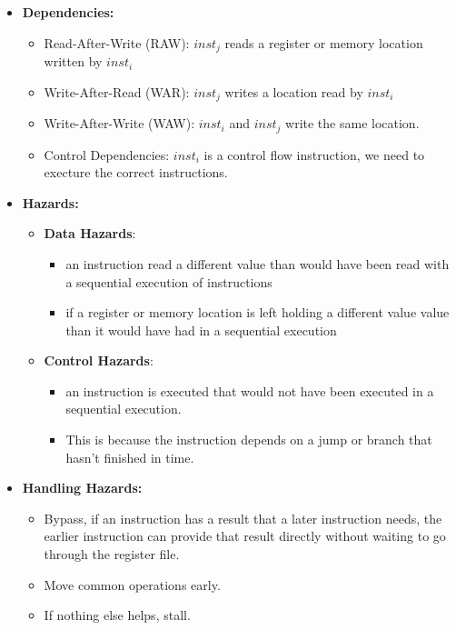 \documentclass[../main.tex]{subfiles}
\begin{document}
\begin{itemize}
	\item \textbf{Dependencies:}
	      \begin{itemize}
		      \item Read-After-Write (RAW): \(inst_j\) reads a register or memory location written by \(inst_i\)
		      \item Write-After-Read (WAR): \(inst_j\) writes a location read by \(inst_i\)
		      \item Write-After-Write (WAW): \(inst_i\) and \(inst_j\) write the same location.
		      \item Control Dependencies: \(inst_i\) is a control flow instruction, we need to execture the correct instructions.
	      \end{itemize}
	\item \textbf{Hazards:}
	      \begin{itemize}
		      \item \textbf{Data Hazards}:
		            \begin{itemize}
			            \item an instruction read a different value than would have been read with a sequential execution of instructions
			            \item if a register or memory location is left holding a different value value than it would have had in a sequential execution
		            \end{itemize}
		      \item \textbf{Control Hazards}:
		            \begin{itemize}
			            \item an instruction is executed that would not have been executed in a sequential execution.
			            \item This is because the instruction depends on a jump or branch that hasn't finished in time.
		            \end{itemize}
	      \end{itemize}
	      \item \textbf{Handling Hazards:}
		            \begin{itemize}
			            \item Bypass, if an instruction has a result that a later instruction needs, the earlier instruction can provide that result directly without waiting to go through the register file.
			            \item Move common operations early.
			            \item If nothing else helps, stall.
		            \end{itemize}
\end{itemize}
\end{document}
